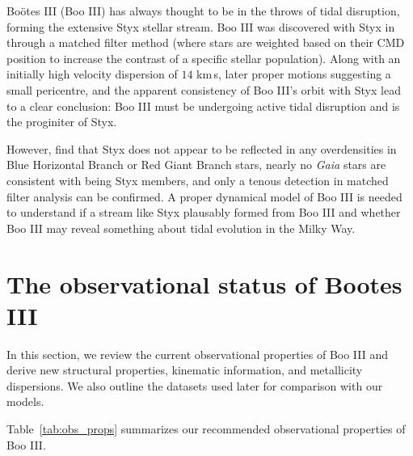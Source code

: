 \documentclass{aa}
\newcommand{\Gaia}{\textit{Gaia}}
\newcommand{\bootes}{Bo\"otes III}
\newcommand{\boo}{Boo III}
\begin{document}
\bootes{} (\boo{}) has always thought to be in the throws of tidal disruption, forming the extensive Styx stellar stream. \boo{} was discovered with Styx in \citet{grillmair2009} through a matched filter method (where stars are weighted based on their CMD position to increase the contrast of a specific stellar population). Along with an initially high velocity dispersion of $14$ km\,s, later proper motions suggesting a small pericentre, and the apparent consistency of \boo{}'s orbit with Styx lead to a clear conclusion: \boo{} must be undergoing active tidal disruption and is the proginiter of Styx. 

However, \citep{jensen+2026} find that Styx does not appear to be reflected in any overdensities in Blue Horizontal Branch or Red Giant Branch stars, nearly no \Gaia{} stars are consistent with being Styx members, and only a tenous detection in matched filter analysis can be confirmed. A proper dynamical model of \boo{} is needed to understand if a stream like Styx plausably formed from \boo{} and whether \boo{} may reveal something about tidal evolution in the Milky Way. 



\section{The observational status of Bootes III}
In this section, we review the current observational properties of \boo{} and derive new structural properties, kinematic information, and metallicity dispersions. We also outline the datasets used later for comparison with our models.

Table~\ref{tab:obs_props} summarizes our recommended observational properties of \boo{}.
\end{document}
